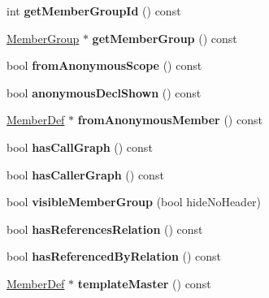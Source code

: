 \begin{DoxyCompactItemize}
\item 
\mbox{\label{class_member_def_a703cb9d7f3fec1551c11edd8163fd9c7}} 
int {\bfseries get\+Member\+Group\+Id} () const
\item 
\mbox{\label{class_member_def_afbf5bbdf5aecb1755c3e803cbcad6181}} 
\mbox{\hyperlink{class_member_group}{Member\+Group}} $\ast$ {\bfseries get\+Member\+Group} () const
\item 
\mbox{\label{class_member_def_a907a1f079d7643ae52488a39b0803328}} 
bool {\bfseries from\+Anonymous\+Scope} () const
\item 
\mbox{\label{class_member_def_af40d14f6263da75c6c414f858684552b}} 
bool {\bfseries anonymous\+Decl\+Shown} () const
\item 
\mbox{\label{class_member_def_a69f2c2a06259ccabffee874b31f10d9d}} 
\mbox{\hyperlink{class_member_def}{Member\+Def}} $\ast$ {\bfseries from\+Anonymous\+Member} () const
\item 
\mbox{\label{class_member_def_ade09466e3bc5480de620c48472d6843b}} 
bool {\bfseries has\+Call\+Graph} () const
\item 
\mbox{\label{class_member_def_ad61f97a0738e40f0adf993161f4cb4e2}} 
bool {\bfseries has\+Caller\+Graph} () const
\item 
\mbox{\label{class_member_def_a542cbc35f38ab6ec9006655b03269941}} 
bool {\bfseries visible\+Member\+Group} (bool hide\+No\+Header)
\item 
\mbox{\label{class_member_def_a9e7bbf3a4445964a7b44b25c18781481}} 
bool {\bfseries has\+References\+Relation} () const
\item 
\mbox{\label{class_member_def_ab4ed50b2a6236fdbe94c9797f0501c59}} 
bool {\bfseries has\+Referenced\+By\+Relation} () const
\item 
\mbox{\label{class_member_def_a1558ce2901a9ffc46b91b6fec80ff888}} 
\mbox{\hyperlink{class_member_def}{Member\+Def}} $\ast$ {\bfseries template\+Master} () const

\end{DoxyCompactItemize}
